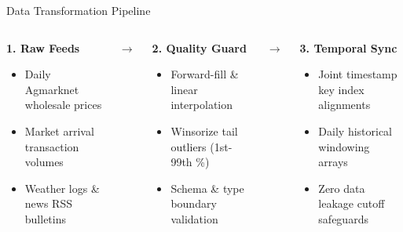 \documentclass{beamer}
\begin{document}
\begin{frame}{Data Transformation Pipeline}
\vspace{-0.1cm}

\begin{columns}[T]
    \begin{smallcard}[0.98\textwidth]
        \centering
        \textbf{\textcolor{primaryDark}{1. Raw Feeds}}
        \vspace{0.05cm}
        \begin{itemize}
            \fontsize{4.2pt}{4.8pt}\selectfont
            \item Daily Agmarknet wholesale prices
            \item Market arrival transaction volumes
            \item Weather logs \& news RSS bulletins
        \end{itemize}
    \end{smallcard}

    \centering \vspace{0.6cm} \textcolor{primaryLight}{\tiny $\rightarrow$}

    \begin{smallcard}[0.98\textwidth]
        \centering
        \textbf{\textcolor{primaryDark}{2. Quality Guard}}
        \vspace{0.05cm}
        \begin{itemize}
            \fontsize{4.2pt}{4.8pt}\selectfont
            \item Forward-fill \& linear interpolation
            \item Winsorize tail outliers (1st-99th \%)
            \item Schema \& type boundary validation
        \end{itemize}
    \end{smallcard}

    \centering \vspace{0.6cm} \textcolor{primaryLight}{\tiny $\rightarrow$}

    \begin{smallcard}[0.98\textwidth]
        \centering
        \textbf{\textcolor{primaryDark}{3. Temporal Sync}}
        \vspace{0.05cm}
        \begin{itemize}
            \fontsize{4.2pt}{4.8pt}\selectfont
            \item Joint timestamp key index alignments
            \item Daily historical windowing arrays
            \item Zero data leakage cutoff safeguards
        \end{itemize}
    \end{smallcard}


\end{columns}
\end{frame}
\end{document}
